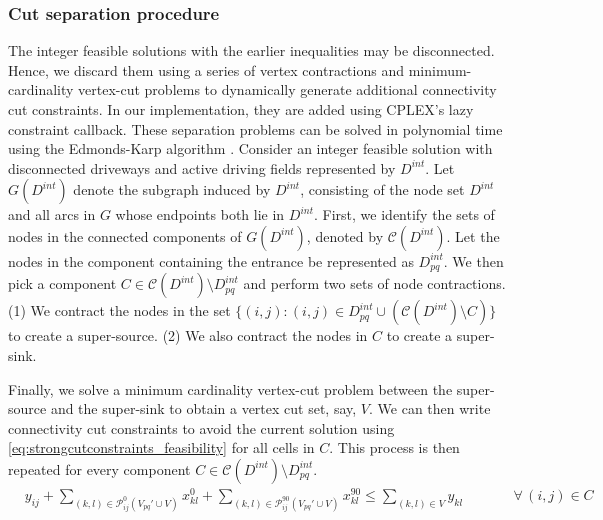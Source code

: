 \documentclass[10pt]{article}
\newcommand{\zeroparkvar}[2]{x^{0}_{#1#2}}
\newcommand{\ninetyparkvar}[2]{x^{90}_{#1#2}}
\newcommand{\drivevar}[2]{y_{#1#2}}
\newcommand{\grid}{G}
\newcommand{\vertexcutset}{V}
\newcommand{\twowaypartitioncomp}[1]{V_{#1}'}
\newcommand{\invzeroparksetcut}[3]{\mathcal{P}^{0}_{#1#2}(#3)}
\newcommand{\invninetyparksetcut}[3]{\mathcal{P}_{#1#2}^{90}(#3)}
\theoremstyle{definition}
\begin{document}
\subsubsection{Cut separation procedure}
\label{sec:disc_infeasible_two_way}
The integer feasible solutions with the earlier inequalities may be disconnected. Hence, we discard them using a series of vertex contractions and minimum-cardinality vertex-cut problems to dynamically generate additional connectivity cut constraints. In our implementation, they are added using CPLEX's lazy constraint callback. These separation problems can be solved in polynomial time using the Edmonds-Karp algorithm \citep{edmonds1972theoretical}. Consider an integer feasible solution with disconnected driveways and active driving fields represented by $D^{int}$. Let $G(D^{int})$ denote the subgraph induced by $D^{int}$, consisting of the node set $D^{int}$ and all arcs in $\grid$ whose endpoints both lie in $D^{int}$. First, we identify the sets of nodes in the connected components of $\grid(D^{int})$, denoted by $\mathcal{C}(D^{int})$. Let the nodes in the component containing the entrance be represented as $D^{int}_{pq}$. We then pick a component $C \in \mathcal{C}(D^{int}) \setminus D^{int}_{pq}$ and perform two sets of node contractions. (1) We contract the nodes in the set $\{(i, j) : (i, j) \in D^{int}_{pq} \cup (\mathcal{C}(D^{int}) \setminus C) \}$ to create a super-source. (2) We also contract the nodes in $C$ to create a super-sink. 


Finally, we solve a minimum cardinality vertex-cut problem between the super-source and the super-sink to obtain a vertex cut set, say, $V$. We can then write connectivity cut constraints to avoid the current solution using \eqref{eq:strongcutconstraints_feasibility} for all cells in $C$. This process is then repeated for every component $C \in \mathcal{C}(D^{int}) \setminus D^{int}_{pq}$. 
\begin{align}
     & \drivevar{i}{j} + \sum_{(k, l) \in \invzeroparksetcut{i}{j}{{\twowaypartitioncomp{pq} \cup \vertexcutset}}} \zeroparkvar{k}{l} + \sum_{(k, l) \in \invninetyparksetcut{i}{j}{\twowaypartitioncomp{pq} \cup \vertexcutset}} \ninetyparkvar{k}{l} \leq \sum_{(k,l) \in \vertexcutset} \drivevar{k}{l} \qquad && \forall \, (i, j) \in C   \label{eq:strongcutconstraints_feasibility}
\end{align}
\end{document}
